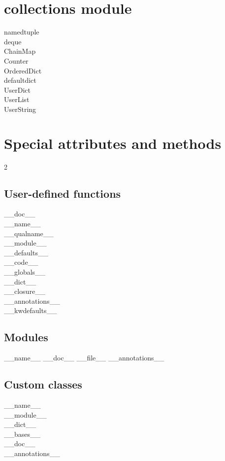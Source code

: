 \documentclass [8pt] {extarticle}
\begin{document}
    \section {collections module}

    namedtuple \\
    deque \\
    ChainMap \\
    Counter \\
    OrderedDict \\
    defaultdict \\
    UserDict \\
    UserList \\
    UserString \\

    \pagebreak

    \section {Special attributes and methods}
    

    \begin {multicols} {2}
    \subsection {User-defined functions}
    \_\_doc\_\_ \\
    \_\_name\_\_ \\
    \_\_qualname\_\_ \\
    \_\_module\_\_ \\
    \_\_defaults\_\_ \\
    \_\_code\_\_ \\
    \_\_globals\_\_ \\
    \_\_dict\_\_ \\
    \_\_closure\_\_ \\
    \_\_annotations\_\_ \\
    \_\_kwdefaults\_\_ \\

    \columnbreak

    \subsection {Modules}
    \_\_name\_\_ \quad
    \_\_doc\_\_ \quad
    \_\_file\_\_ \quad
    \_\_annotations\_\_ \quad

    \subsection {Custom classes}
    \_\_name\_\_ \\
    \_\_module\_\_ \\
    \_\_dict\_\_ \\
    \_\_bases\_\_ \\
    \_\_doc\_\_ \\
    \_\_annotations\_\_ \\
    \end {multicols}
\end{document}
